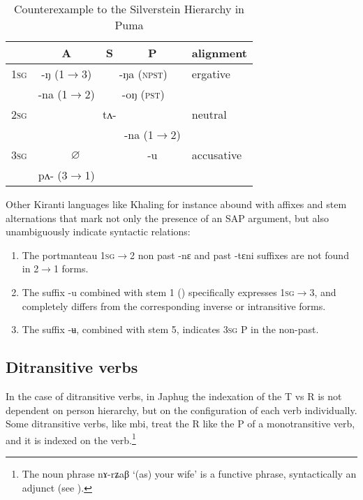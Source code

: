 \documentclass[oldfontcommands,oneside,a4paper,11pt]{article}
\newcommand{\ipa}[1]{{\phon \mbox{#1}}} %
\newcommand{\grise}[1]{\cellcolor{lightgray}\textbf{#1}}
\begin{document}
\begin{table}[H]
\caption{Counterexample to the Silverstein Hierarchy in Puma} \label{tab:silverstein} \centering
\begin{tabular}{l|c|c|c|l}
\toprule
& A & S & P & alignment\\
\hline
\textsc{1sg}& \ipa{-ŋ} (1$\rightarrow$3)& \multicolumn{2}{|c|}{\ipa{-ŋa} \grise{}(\textsc{npst})}  &ergative\\
 & \ipa{-na} (1$\rightarrow$2)& \multicolumn{2}{|c|}{\ipa{-oŋ} \grise{}(\textsc{pst})} &\\
\hline
 \textsc{2sg} & \multicolumn{3}{c|}{\ipa{tʌ-}}& neutral\\
 \cline{4-4}
 &\multicolumn{2}{c|}{}&\ipa{-na} (1$\rightarrow$2)&\\
 \hline
  \textsc{3sg} & \multicolumn{2}{c|}{$\varnothing$} & \ipa{-u} &accusative\\
   \cline{2-2}
  &\ipa{pʌ-}  (3$\rightarrow$1) & &\\
  \bottomrule
\end{tabular}
\end{table}

Other Kiranti languages like Khaling for instance abound with affixes and stem alternations that mark not only the presence of an SAP argument, but also unambiguously indicate syntactic relations:

\begin{enumerate}
\item The portmanteau \textsc{1sg$\rightarrow$2} non past \ipa{-nɛ} and past \ipa{-tɛni} suffixes are not found in 2$\rightarrow$1 forms.
\item The suffix \ipa{-u}  combined with stem 1 (\citealt[1104]{jacques12khaling}) specifically expresses \textsc{1sg$\rightarrow$3}, and completely differs from the corresponding inverse or intransitive forms.
\item The suffix \ipa{-ʉ}, combined with stem 5, indicates \textsc{3sg} P in the non-past.
\end{enumerate}


\subsection{Ditransitive verbs}
In the case of ditransitive verbs, in Japhug the indexation of the T vs R is not dependent on person hierarchy, but on the configuration of each verb individually. Some ditransitive verbs, like \ipa{mbi}, treat the R like the P of a monotransitive verb, and it is indexed on the verb.\footnote{The noun phrase \ipa{nɤ-rʑaβ} `(as) your wife' is a functive phrase, syntactically an adjunct (see \citealt{creissels14functive}).}
\end{document}
